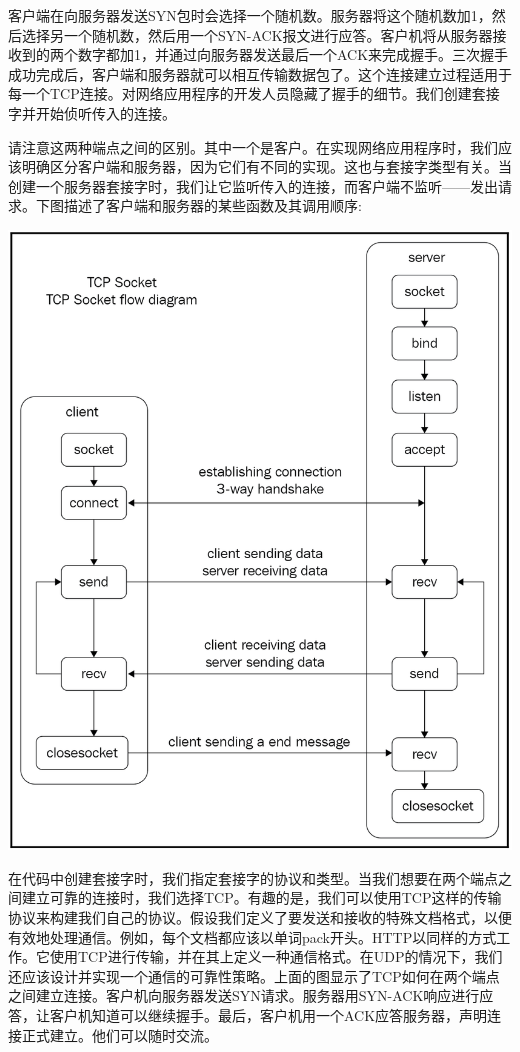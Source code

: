 客户端在向服务器发送SYN包时会选择一个随机数。服务器将这个随机数加1，然后选择另一个随机数，然后用一个SYN-ACK报文进行应答。客户机将从服务器接收到的两个数字都加1，并通过向服务器发送最后一个ACK来完成握手。三次握手成功完成后，客户端和服务器就可以相互传输数据包了。这个连接建立过程适用于每一个TCP连接。对网络应用程序的开发人员隐藏了握手的细节。我们创建套接字并开始侦听传入的连接。 \par
请注意这两种端点之间的区别。其中一个是客户。在实现网络应用程序时，我们应该明确区分客户端和服务器，因为它们有不同的实现。这也与套接字类型有关。当创建一个服务器套接字时，我们让它监听传入的连接，而客户端不监听——发出请求。下图描述了客户端和服务器的某些函数及其调用顺序: \par

\begin{center}
	\includegraphics[width=1.0\textwidth]{content/Section-2/Chapter-12/9}
\end{center}

在代码中创建套接字时，我们指定套接字的协议和类型。当我们想要在两个端点之间建立可靠的连接时，我们选择TCP。有趣的是，我们可以使用TCP这样的传输协议来构建我们自己的协议。假设我们定义了要发送和接收的特殊文档格式，以便有效地处理通信。例如，每个文档都应该以单词pack开头。HTTP以同样的方式工作。它使用TCP进行传输，并在其上定义一种通信格式。在UDP的情况下，我们还应该设计并实现一个通信的可靠性策略。上面的图显示了TCP如何在两个端点之间建立连接。客户机向服务器发送SYN请求。服务器用SYN-ACK响应进行应答，让客户机知道可以继续握手。最后，客户机用一个ACK应答服务器，声明连接正式建立。他们可以随时交流。 \par

